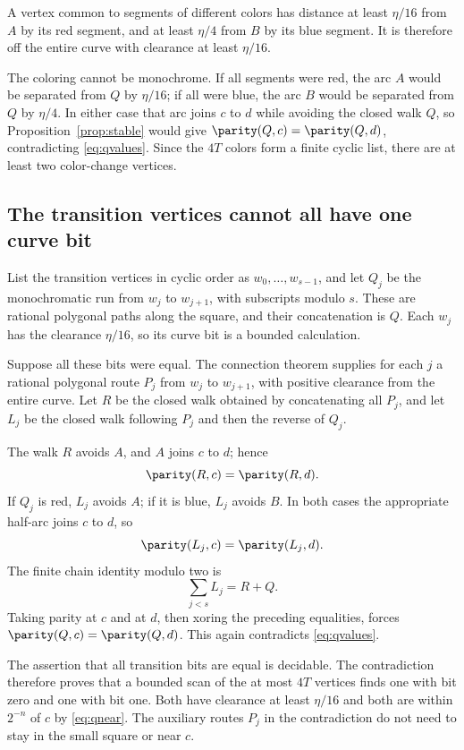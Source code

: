 A vertex common to segments of different colors has distance at least
$\eta/16$ from $A$ by its red segment, and at least $\eta/4$
from $B$ by its blue segment. It is therefore off the entire
curve with clearance at least $\eta/16$.

The coloring cannot be monochrome. If all segments were red,
the arc $A$ would be separated from $Q$ by $\eta/16$; if all
were blue, the arc $B$ would be separated from $Q$ by $\eta/4$.
In either case that arc joins $c$ to $d$ while avoiding the
closed walk $Q$, so Proposition~\ref{prop:stable} would give
$\parity(Q,c)=\parity(Q,d)$, contradicting \eqref{eq:qvalues}.
Since the $4T$ colors form a finite cyclic list, there are
at least two color-change vertices.

\subsection{The transition vertices cannot all have one curve bit}

List the transition vertices in cyclic order as
$w_0,\ldots,w_{s-1}$, and let $Q_j$ be the monochromatic
run from $w_j$ to $w_{j+1}$, with subscripts modulo $s$.
These are rational polygonal paths along the square, and their
concatenation is $Q$.
Each $w_j$ has the clearance $\eta/16$, so its curve bit is
a bounded calculation.

Suppose all these bits were equal. The connection theorem supplies
for each $j$ a rational polygonal route $P_j$ from $w_j$ to
$w_{j+1}$, with positive clearance from the entire curve.
Let $R$ be the closed walk obtained by concatenating all $P_j$,
and let $L_j$ be the closed walk following $P_j$ and then
the reverse of $Q_j$.

The walk $R$ avoids $A$, and $A$ joins $c$ to $d$; hence
\[
                         \parity(R,c)=\parity(R,d).
\]
If $Q_j$ is red, $L_j$ avoids $A$; if it is blue, $L_j$ avoids
$B$. In both cases the appropriate half-arc joins $c$ to $d$,
so
\[
                         \parity(L_j,c)=\parity(L_j,d).
\]
The finite chain identity modulo two is
\[
                         \sum_{j<s}L_j=R+Q.
\]
Taking parity at $c$ and at $d$, then xoring the preceding
equalities, forces $\parity(Q,c)=\parity(Q,d)$.
This again contradicts \eqref{eq:qvalues}.

The assertion that all transition bits are equal is decidable.
The contradiction therefore proves that a bounded scan of the
at most $4T$ vertices finds one with bit zero and one with bit one.
Both have clearance at least $\eta/16$ and both are within
$2^{-n}$ of $c$ by \eqref{eq:qnear}.
The auxiliary routes $P_j$ in the contradiction do not need to
stay in the small square or near $c$.

